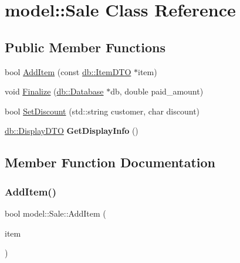 \hypertarget{classmodel_1_1Sale}{}\section{model\+:\+:Sale Class Reference}
\label{classmodel_1_1Sale}
\subsection*{Public Member Functions}
\begin{DoxyCompactItemize}
\item 
bool \mbox{\hyperlink{classmodel_1_1Sale_a5c6b5c51018129dc8ddc9527781be80f}{Add\+Item}} (const \mbox{\hyperlink{classdb_1_1ItemDTO}{db\+::\+Item\+D\+TO}} $\ast$item)
\item 
void \mbox{\hyperlink{classmodel_1_1Sale_a092d73ac058910164043c5d2a4c27bf6}{Finalize}} (\mbox{\hyperlink{classdb_1_1Database}{db\+::\+Database}} $\ast$db, double paid\+\_\+amount)
\item 
bool \mbox{\hyperlink{classmodel_1_1Sale_adf3d95e3f8ec65f7c7c707e982dd3169}{Set\+Discount}} (std\+::string customer, char discount)
\item 
\mbox{\label{classmodel_1_1Sale_a0ddbf2f94470ae590130e8c60e8f32b7}} 
\mbox{\hyperlink{classdb_1_1DisplayDTO}{db\+::\+Display\+D\+TO}} {\bfseries Get\+Display\+Info} ()
\end{DoxyCompactItemize}


\subsection{Member Function Documentation}
\mbox{\label{classmodel_1_1Sale_a5c6b5c51018129dc8ddc9527781be80f}} 
\subsubsection{\texorpdfstring{Add\+Item()}{AddItem()}}
{\footnotesize\ttfamily bool model\+::\+Sale\+::\+Add\+Item (\begin{DoxyParamCaption}\item[{const \mbox{\hyperlink{classdb_1_1ItemDTO}{db\+::\+Item\+D\+TO}} $\ast$}]{item }\end{DoxyParamCaption})}

